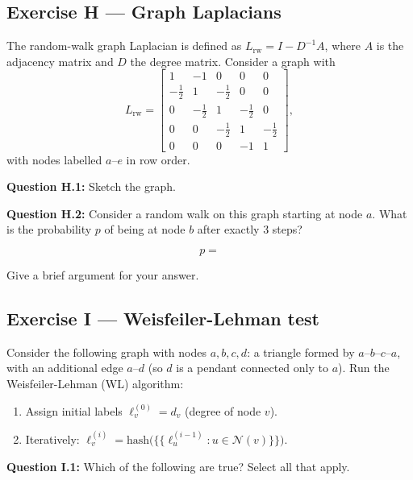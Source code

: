 \documentclass[12pt,a4paper]{article}
\begin{document}
\subsection*{Exercise H --- Graph Laplacians}

The random-walk graph Laplacian is defined as $L_{\mathrm{rw}} = I - D^{-1}A$, where $A$ is the
adjacency matrix and $D$ the degree matrix.  Consider a graph with
\[
  L_{\mathrm{rw}} =
  \begin{bmatrix}
    1  & -1   & 0    & 0    & 0    \\
    -\tfrac12 & 1 & -\tfrac12 & 0 & 0 \\
    0  & -\tfrac12 & 1 & -\tfrac12 & 0 \\
    0  &  0  & -\tfrac12 & 1 & -\tfrac12 \\
    0  &  0  & 0    & -1   & 1
  \end{bmatrix},
\]
with nodes labelled $a$--$e$ in row order.

\textbf{Question H.1:} Sketch the graph.

\vspace{3cm}

\textbf{Question H.2:} Consider a random walk on this graph starting at node $a$.  What is the
probability $p$ of being at node $b$ after exactly 3 steps?

\[
  p =
\]

Give a brief argument for your answer.

\vspace{3cm}

\subsection*{Exercise I --- Weisfeiler-Lehman test}

Consider the following graph with nodes $a, b, c, d$: a triangle formed by $a$--$b$--$c$--$a$,
with an additional edge $a$--$d$ (so $d$ is a pendant connected only to $a$).  Run the
Weisfeiler-Lehman (WL) algorithm:
\begin{enumerate}[noitemsep]
  \item Assign initial labels $\ell^{(0)}_v = d_v$ (degree of node $v$).
  \item Iteratively: $\ell^{(i)}_v = \mathrm{hash}\!\bigl(\{\!\{\ell^{(i-1)}_u : u\in\mathcal{N}(v)\}\!\}\bigr)$.
\end{enumerate}

\textbf{Question I.1:} Which of the following are true?  Select all that apply.
\end{document}

